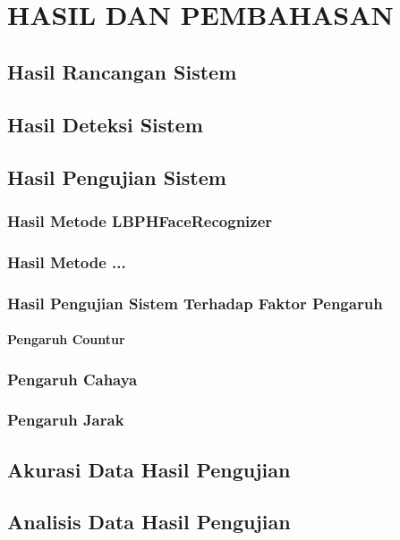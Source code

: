 \chapter[HASIL DAN PEMBAHASAN]{\\HASIL DAN PEMBAHASAN}

\section{Hasil Rancangan Sistem}
\section{Hasil Deteksi Sistem}
\section{Hasil Pengujian Sistem}
\subsection{Hasil Metode LBPHFaceRecognizer}
\subsection{Hasil Metode ...}
\subsection{Hasil Pengujian Sistem Terhadap Faktor Pengaruh}
\subsubsection{Pengaruh Countur}
\subsection{Pengaruh Cahaya}
\subsection{Pengaruh Jarak}
\section{Akurasi Data Hasil Pengujian}
\section{Analisis Data Hasil Pengujian}